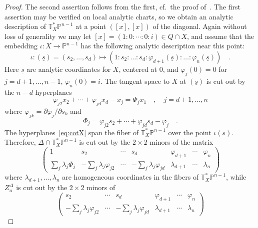 \documentclass[11pt]{amsart}
\numberwithin{equation}{section}
\newcommand{\Pbb}{{\mathbb{P}}}
\newcommand{\Tbb}{{\mathbb{T}}}
\newcommand{\us}{\underline s}
\begin{document}
\begin{proof}
The second assertion follows from the first, cf.~the proof of~\cite[Lemma~1.2]{MR97b:14057}.
The first assertion may be verified on local analytic charts, so we obtain an analytic
description of $\Tbb^*_X\Pbb^{n-1}$ at a point $([x],[x])$ of the diagonal. 
Again without loss of generality we may let $[x]=(1:0:\cdots:0:i)\in Q\cap X$, and 
assume that the embedding $\iota:X\to \Pbb^{n-1}$ has the following analytic description 
near this point:
\[
\iota:(\us)=(s_2,\dots, s_d) \mapsto (1:s_2:\dots: s_d:\varphi_{d+1}(\us):\dots: \varphi_n(\us))\quad.
\]
Here $\us$ are analytic coordinates for $X$, centered at $0$, and $\varphi_j(0)=0$
for $j=d+1,\dots, n-1$, $\varphi_n(0)=i$.
The tangent space to $X$ at $(\us)$ is cut out by the $n-d$ hyperplanes 
\begin{equation}\label{eq:cotX}
\varphi_{j2} x_2 + \cdots + \varphi_{jd} x_d -x_j = \Phi_j x_1\quad,\quad j=d+1,\dots, n
\end{equation}
where $\varphi_{jk} = \partial \varphi_j/\partial s_k$ and
\[
\Phi_j = \varphi_{j2}s_2 + \cdots + \varphi_{jd} s_d - \varphi_j\quad.
\]
The hyperplanes~\eqref{eq:cotX} span the fiber of $\Tbb^*_X\Pbb^{n-1}$ over the
point $\iota(\us)$. Therefore, $\Delta\cap \Tbb^*_X\Pbb^{n-1}$ is cut out by the $2\times 2$
minors of the matrix
\begin{equation}
\begin{pmatrix}
1 & s_2 & \cdots & s_d & \varphi_{d+1} & \cdots & \varphi_n \\
\sum_j \lambda_j \Phi_j & -\sum_j \lambda_j \varphi_{j2} & \cdots &
-\sum_j \lambda_j \varphi_{jd} & \lambda_{d+1} & \cdots & \lambda_n
\end{pmatrix}
\end{equation}
where $\lambda_{d+1},\dots,\lambda_n$ are homogeneous coordinates in the fibers
of $\Tbb^*_X\Pbb^{n-1}$, while $Z^\Delta_u$ is cut out by the $2\times 2$ minors of
\begin{equation}\label{eq:ZDuinX}
\begin{pmatrix}
s_2 & \cdots & s_d & \varphi_{d+1} & \cdots & \varphi_n \\
-\sum_j \lambda_j \varphi_{j2} & \cdots &
-\sum_j \lambda_j \varphi_{jd} & \lambda_{d+1} & \cdots & \lambda_n
\end{pmatrix}
\end{equation}


\end{proof}
\end{document}
